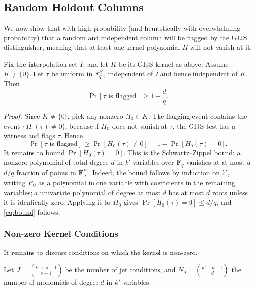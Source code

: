 \subsection{Random Holdout Columns}\label{sec:rand-holdout}
We now show that with high probability (and heuristically with overwhelming
probability) that a random and independent column
will be flagged by the GIJS distinguisher, meaning that at least one kernel
polynomial $H$ will not vanish at it.

\begin{theorem}
    Fix the interpolation set $I$, and let $K$ be its GIJS kernel
    as above. Assume $K \ne \{0\}$. Let $\tau$ be uniform in
    $\mathbf{F}_q^{k'}$, independent of $I$ and hence independent
    of $K$. Then
    \begin{equation}
        \Pr[\tau \text{ is flagged}] \ge 1 - \frac{d}{q}.
        \label{eq:bound}
    \end{equation}
\end{theorem}

\begin{proof}
    Since $K \ne \{0\}$, pick any nonzero $H_0 \in K$. The flagging
    event contains the event $\{H_0(\tau) \ne 0\}$, because if
    $H_0$ does not vanish at $\tau$, the GIJS test has a witness
    and flags $\tau$. Hence
    \[
        \Pr[\tau \text{ is flagged}]
        \ge \Pr[H_0(\tau) \ne 0]
        = 1 - \Pr[H_0(\tau) = 0].
    \]
    It remains to bound $\Pr[H_0(\tau) = 0]$. This is the
    Schwartz--Zippel bound: a nonzero polynomial of total degree
    $d$ in $k'$ variables over $\mathbf{F}_q$ vanishes at at most
    a $d/q$ fraction of points in $\mathbf{F}_q^{k'}$. Indeed, the
    bound follows by induction on $k'$, writing $H_0$ as a
    polynomial in one variable with coefficients in the remaining
    variables; a univariate polynomial of degree at most $d$ has at
    most $d$ roots unless it is identically zero. Applying it to
    $H_0$ gives $\Pr[H_0(\tau) = 0] \le d/q$, and
    \eqref{eq:bound} follows.
\end{proof}

\subsubsection{Non-zero Kernel Conditions}\label{sec:nonzero-kernel}
It remains to discuss conditions on which the kernel is non-zero. 

Let $J=\binom{k'+s-1}{s-1}$ be the number of jet conditions, and 
$N_d=\binom{k'+d-1}{d}$ the number of monomials of degree $d$ in $k'$ variables.

